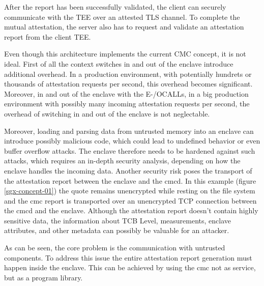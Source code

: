 After the report has been successfully validated, the client can securely communicate with the TEE over an attested TLS channel. To complete the mutual attestation, the server also has to request and validate an attestation report from the client TEE. 

Even though this architecture implements the current CMC concept, it is not ideal.
First of all the context switches in and out of the enclave introduce additional overhead. In a production environment, with potentially hundrets or thousands of attestation requests per second, this overhead becomes significant. Moreover, in and out of the enclave with the E-/OCALLs, in a big production environment with possibly many incoming attestation requests per second, the overhead of switching in and out of the enclave is not neglectable.

Moreover, loading and parsing data from untrusted memory into an enclave can introduce possibly malicious code, which could lead to undefined behavior or even buffer overflow attacks. The enclave therefore needs to be hardened against such attacks, which requires an in-depth security analysis, depending on how the enclave handles the incoming data. Another security risk poses the transport of the attestation report between the enclave and the cmcd. In this example (figure \ref{sgx-concept-01}) the quote remains unencrypted while resting on the file system and the cmc report is transported over an unencrypted TCP connection between the cmcd and the enclave. Although the attestation report doesn’t contain highly sensitive data, the information about TCB Level, measurements, enclave attributes, and other metadata can possibly be valuable for an attacker. 

As can be seen, the core problem is the communication with untrusted components. To address this issue the entire attestation report generation must happen inside the enclave. This can be achieved by using the cmc not as service, but as a program library.


